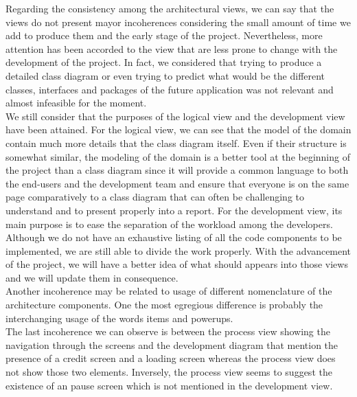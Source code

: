 Regarding the consistency among the architectural views, we can say that the views do not present mayor incoherences considering the small amount of time we add to produce them and the early stage of the project. Nevertheless, more attention has been accorded to the view that are less prone to change with the development of the project. In fact, we considered that trying to produce a detailed class diagram or even trying to predict what would be the different classes, interfaces and packages of the future application was not relevant and almost infeasible for the moment. \\

We still consider that the purposes of the logical view and the development view have been attained. For the logical view, we can see that the model of the domain contain much more details that the class diagram itself. Even if their structure is somewhat similar, the modeling of the domain is a better tool at the beginning of the project than a class diagram since it will provide a common language to both the end-users and the development team and ensure that everyone is on the same page comparatively to a class diagram that can often be challenging to understand and to present properly into a report. For the development view, its main purpose is to ease the separation of the workload among the developers. Although we do not have an exhaustive listing of all the code components to be implemented, we are still able to divide the work properly. With the advancement of the project, we will have a better idea of what should appears into those views and we will update them in consequence. \\

Another incoherence may be related to usage of different nomenclature of the architecture components. One the most egregious difference is probably the interchanging usage of the words items and powerups. \\

The last incoherence we can observe is between the process view showing the navigation through the screens and the development diagram that mention the presence of a credit screen and a loading screen whereas the process view does not show those two elements. Inversely, the process view seems to suggest the existence of an pause screen which is not mentioned in the development view.   
